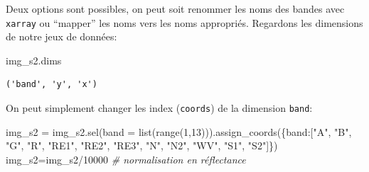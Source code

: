 \documentclass[
]{article}
\newenvironment{Shaded}{}{}
\newcommand{\BuiltInTok}[1]{\textcolor[rgb]{0.00,0.50,0.00}{#1}}
\newcommand{\CommentTok}[1]{\textcolor[rgb]{0.38,0.63,0.69}{\textit{#1}}}
\newcommand{\DecValTok}[1]{\textcolor[rgb]{0.25,0.63,0.44}{#1}}
\newcommand{\NormalTok}[1]{#1}
\newcommand{\OperatorTok}[1]{\textcolor[rgb]{0.40,0.40,0.40}{#1}}
\newcommand{\StringTok}[1]{\textcolor[rgb]{0.25,0.44,0.63}{#1}}
\begin{document}
Deux options sont possibles, on peut soit renommer les noms des bandes
avec \texttt{xarray} ou ``mapper'' les noms vers les noms appropriés.
Regardons les dimensions de notre jeux de données:

\label{aae31d76}
\label{cb11}
\begin{Shaded}
\begin{Highlighting}[]
\NormalTok{img\_s2.dims}
\end{Highlighting}
\end{Shaded}

\begin{verbatim}
('band', 'y', 'x')
\end{verbatim}

On peut simplement changer les index (\texttt{coords}) de la dimension
\texttt{band}:

\label{c7dde0f8}
\label{cb13}
\begin{Shaded}
\begin{Highlighting}[]
\NormalTok{img\_s2 }\OperatorTok{=}\NormalTok{ img\_s2.sel(band }\OperatorTok{=} \BuiltInTok{list}\NormalTok{(}\BuiltInTok{range}\NormalTok{(}\DecValTok{1}\NormalTok{,}\DecValTok{13}\NormalTok{))).assign\_coords(\{}\StringTok{\textquotesingle{}band\textquotesingle{}}\NormalTok{:[}\StringTok{"A"}\NormalTok{, }\StringTok{"B"}\NormalTok{, }\StringTok{"G"}\NormalTok{, }\StringTok{"R"}\NormalTok{, }\StringTok{"RE1"}\NormalTok{, }\StringTok{"RE2"}\NormalTok{, }\StringTok{"RE3"}\NormalTok{, }\StringTok{"N"}\NormalTok{, }\StringTok{"N2"}\NormalTok{, }\StringTok{"WV"}\NormalTok{, }\StringTok{"S1"}\NormalTok{, }\StringTok{"S2"}\NormalTok{]\})}
\NormalTok{img\_s2}\OperatorTok{=}\NormalTok{img\_s2}\OperatorTok{/}\DecValTok{10000} \CommentTok{\# normalisation en réflectance}
\end{Highlighting}
\end{Shaded}
\end{document}
